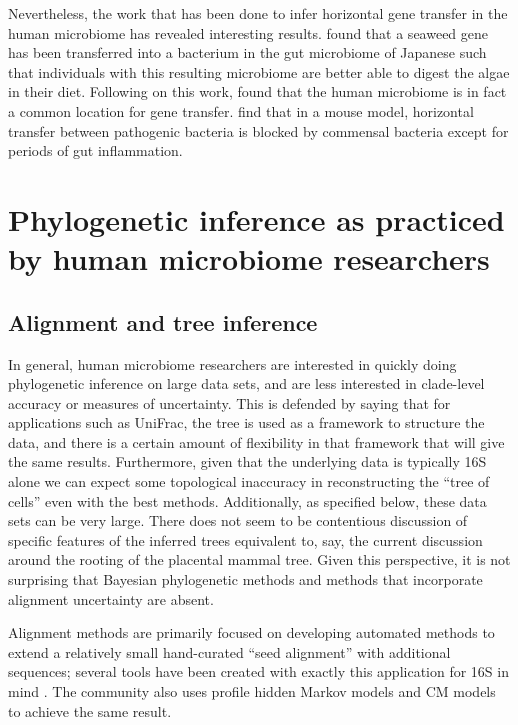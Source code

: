 \documentclass{amsart}
\begin{document}
Nevertheless, the work that has been done to infer horizontal gene transfer in the human microbiome has revealed interesting results.
\citet{hehemann2010transfer} found that a seaweed gene has been transferred into a bacterium in the gut microbiome of Japanese such that individuals with this resulting microbiome are better able to digest the algae in their diet.
Following on this work, \citet{smillie2011ecology} found that the human microbiome is in fact a common location for gene transfer.
\citet{stecher2012gut} find that in a mouse model, horizontal transfer between pathogenic bacteria is blocked by commensal bacteria except for periods of gut inflammation.


\section{Phylogenetic inference as practiced by human microbiome researchers}

\subsection{Alignment and tree inference}
In general, human microbiome researchers are interested in quickly doing phylogenetic inference on large data sets, and are less interested in clade-level accuracy or measures of uncertainty.
This is defended by saying that for applications such as UniFrac, the tree is used as a framework to structure the data, and there is a certain amount of flexibility in that framework that will give the same results.
Furthermore, given that the underlying data is typically 16S alone we can expect some topological inaccuracy in reconstructing the ``tree of cells'' even with the best methods.
Additionally, as specified below, these data sets can be very large.
There does not seem to be contentious discussion of specific features of the inferred trees equivalent to, say, the current discussion around the rooting of the placental mammal tree.
Given this perspective, it is not surprising that Bayesian phylogenetic methods and methods that incorporate alignment uncertainty are absent.

Alignment methods are primarily focused on developing automated methods to extend a relatively small hand-curated ``seed alignment'' with additional sequences; several tools have been created with exactly this application for 16S in mind \citep{desantis2006nast,caporaso2010pynast,pruesse2012sina}.
The community also uses profile hidden Markov models \citep{eddy1998profile} and CM models \citep{nawrocki2009infernal,nawrocki2009structural} to achieve the same result.
\end{document}
